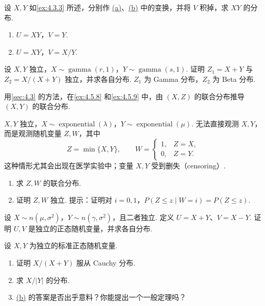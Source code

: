 \begin{exercise}\label{exercise:4.23}
设 $X,Y$ 如\autoref{ex:4.3.3} 所述，分别作 \hyperref[itm:exercise:4.23:a]{(a)}、\hyperref[itm:exercise:4.23:b]{(b)} 中的变换，并将 $V$ 积掉，求 $XY$ 的分布.
\begin{enumerate}
\item[(a)]\label{itm:exercise:4.23:a} $U=XY$，$V=Y$.
\item[(b)]\label{itm:exercise:4.23:b} $U=XY$，$V=X/Y$.
\end{enumerate}
\end{exercise}
\begin{exercise}\label{exercise:4.24}
设 $X,Y$ 独立，$X\sim\operatorname{gamma}(r,1)$，$Y\sim\operatorname{gamma}(s,1)$. 证明 $Z_1=X+Y$ 与 $Z_2=X/(X+Y)$ 独立，并求各自分布. $Z_1$ 为 Gamma 分布，$Z_2$ 为 Beta 分布.
\end{exercise}
\begin{exercise}\label{exercise:4.25}
用\autoref{sec:4.3} 的方法，在\autoref{ex:4.5.8} 和\autoref{ex:4.5.9} 中，由 $(X,Z)$ 的联合分布推导 $(X,Y)$ 的联合分布.
\end{exercise}
\begin{exercise}\label{exercise:4.26}
$X,Y$ 独立，$X\sim\operatorname{exponential}(\lambda)$，$Y\sim\operatorname{exponential}(\mu)$. 无法直接观测 $X,Y$，而是观测随机变量 $Z,W$，其中
$$Z=\min\{X,Y\},\qquad W=\begin{cases}1,&Z=X,\\0,&Z=Y.\end{cases}$$
这种情形尤其会出现在医学实验中；变量 $X,Y$ 受到删失（censoring）.
\begin{enumerate}
\item[(a)] 求 $Z,W$ 的联合分布.
\item[(b)] 证明 $Z,W$ 独立. 提示：证明对 $i=0,1$，$P(Z\le z\mid W=i)=P(Z\le z)$.
\end{enumerate}
\end{exercise}
\begin{exercise}\label{exercise:4.27}
设 $X\sim n(\mu,\sigma^2)$，$Y\sim n(\gamma,\sigma^2)$，且二者独立. 定义 $U=X+Y$、$V=X-Y$. 证明 $U,V$ 是独立的正态随机变量，并求各自分布.
\end{exercise}
\begin{exercise}\label{exercise:4.28}
设 $X,Y$ 为独立的标准正态随机变量.
\begin{enumerate}
\item[(a)] 证明 $X/(X+Y)$ 服从 Cauchy 分布.
\item[(b)]\label{itm:exercise:4.28:b} 求 $X/|Y|$ 的分布.
\item[(c)] \hyperref[itm:exercise:4.28:b]{(b)} 的答案是否出乎意料？你能提出一个一般定理吗？
\end{enumerate}
\end{exercise}
